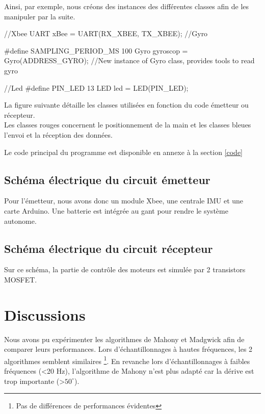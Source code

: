 {Ainsi, par exemple, nous créons des instances des différentes classes afin de les manipuler par la suite.
\begin{Cpp}

  //Xbee
  UART xBee = UART(RX_XBEE, TX_XBEE);
  //Gyro
  
  #define SAMPLING_PERIOD_MS 100
  Gyro gyroscop = Gyro(ADDRESS_GYRO);   //New instance of Gyro class, provides tools to read gyro
  
  //Led
  #define PIN_LED 13
  LED led = LED(PIN_LED);    
\end{Cpp}


La figure suivante détaille les classes utilisées en fonction du code émetteur ou récepteur. \\
Les classes rouges concernent le positionnement de la main et les classes bleues l'envoi et la réception des données.\\

 
 Le code principal du programme est disponible en annexe à la section \ref{code}


\section{Schéma électrique du circuit émetteur}

    
    Pour l'émetteur, nous avons donc un module Xbee, une centrale IMU et une carte Arduino. Une batterie est intégrée au gant pour rendre le système autonome.
    
\section{Schéma électrique du circuit récepteur}

    
    Sur ce schéma, la partie de contrôle des moteurs est simulée par 2 transistors MOSFET.



\chapter{Discussions}


Nous avons pu expérimenter les algorithmes de Mahony et Madgwick afin de comparer leurs performances\cite{algo}. Lors d'échantillonnages à hautes fréquences, les 2 algorithmes semblent similaires \footnote{Pas de différences de performances évidentes}. En revanche lors d'échantillonnages à faibles fréquences (<20 Hz), l'algorithme de Mahony n'est plus adapté car la dérive est trop importante (>$50^{\circ}$).\\

}
